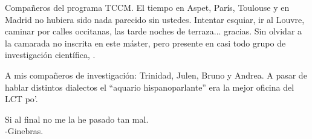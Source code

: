 {Compañeros del programa TCCM. El tiempo en Aspet, París, Toulouse y
en Madrid no hubiera sido nada parecido sin ustedes. Intentar esquiar, ir al
Louvre, caminar por calles occitanas, las tarde noches de terraza... gracias.
Sin olvidar a la camarada no inscrita en este máster, pero presente en
casi todo grupo de investigación científica,
.


A mis compañeros de investigación: Trinidad, Julen, Bruno y Andrea. A pasar de hablar
distintos dialectos el ``aquario hispanoparlante'' era la mejor oficina
del LCT po'. 

\begin{flushright}
Si al final no me la he pasado tan mal.\\
-Ginebras.
\end{flushright}

}

\vspace*{\fill}


